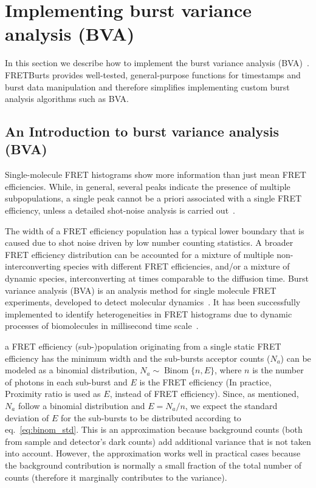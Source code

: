 \section{Implementing burst variance analysis (BVA)}


\label{sec:bva}
In this section we describe how to implement the burst variance analysis (BVA)~\cite{Torella_2011}.
FRETBurts provides well-tested, general-purpose functions for timestamps and burst data 
manipulation and therefore simplifies implementing custom burst analysis algorithms such as BVA.

\subsection{An Introduction to burst variance analysis (BVA)}
Single-molecule FRET histograms show more information than just mean FRET efficiencies. 
While, in general, several peaks indicate the presence of multiple subpopulations, 
a single peak cannot be a priori associated with a single FRET efficiency,
unless a detailed shot-noise analysis is carried out~\cite{Nir_2006,Antonik2006}.

The width of a FRET efficiency population has a typical lower boundary that is caused due to shot noise driven by low number counting statistics. A broader FRET efficiency distribution can be accounted for a mixture of multiple non-interconverting species with different FRET efficiencies, and/or a mixture of dynamic species, interconverting at times comparable to the diffusion time. Burst variance analysis (BVA) is an analysis method for single molecule FRET experiments, developed to detect molecular dynamics~\cite{Torella_2011}. It has been successfully implemented to identify heterogeneities in FRET histograms due to dynamic processes of biomolecules in millisecond time scale~\cite{Torella_2011, Robb_2013}.

a FRET efficiency (sub-)population originating from a single static FRET efficiency has the minimum width and the sub-bursts acceptor counts ($N_a$) can be modeled as a binomial distribution, 
$N_a \sim \operatorname{Binom} \{n, E\}$, where $n$ is the number of photons in each sub-burst and 
$E$ is the FRET efficiency (In practice, Proximity ratio is used as $E$, instead of FRET efficiency). Since, as mentioned, $N_a$ follow a binomial distribution and $E = N_a/n$, we expect the standard deviation of $E$ for the sub-bursts to be distributed according to eq.~\ref{eq:binom_std}. This is an approximation because background counts (both from sample and detector's dark counts) add additional variance that is not taken into account. However, the approximation works well in practical cases because the background contribution
is normally a small fraction of the total number of counts (therefore it marginally contributes to the variance).



